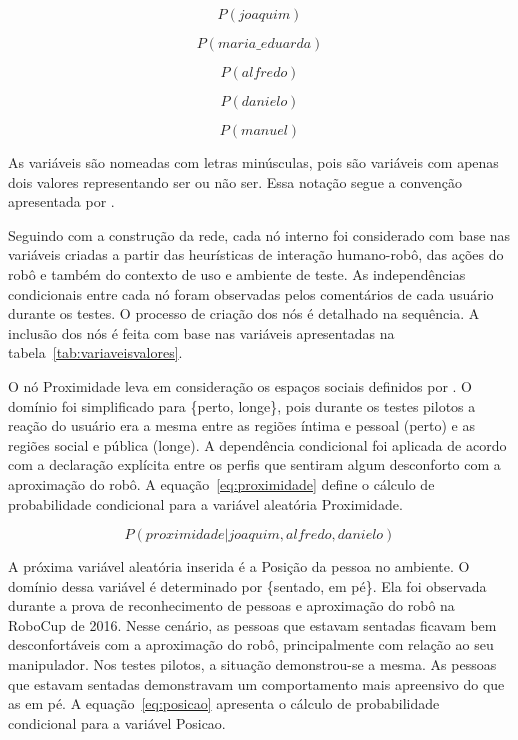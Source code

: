 \begin{equation}
	\label{eq:joaquim}
	P(joaquim)
\end{equation}

\begin{equation}
	\label{eq:mariaeduarda}
	P(maria\_eduarda)
\end{equation}

\begin{equation}
	\label{eq:alfredo}
	P(alfredo)
\end{equation}

\begin{equation}
	\label{eq:danielo}
	P(danielo)
\end{equation}

\begin{equation}
	\label{eq:manuel}
	P(manuel)
\end{equation}

As variáveis são nomeadas com letras minúsculas, pois são variáveis com apenas dois valores representando ser ou não ser. Essa notação segue a convenção apresentada por .

Seguindo com a construção da rede, cada nó interno foi considerado com base nas variáveis criadas a partir das heurísticas de interação humano-robô, das ações do robô e também do contexto de uso e ambiente de teste. As independências condicionais entre cada nó foram observadas pelos comentários de cada usuário durante os testes. O processo de criação dos nós é detalhado na sequência. A inclusão dos nós é feita com base nas variáveis apresentadas na tabela~\ref{tab:variaveisvalores}.

O nó Proximidade leva em consideração os espaços sociais definidos por . O domínio foi simplificado para \{perto, longe\}, pois durante os testes pilotos a reação do usuário era a mesma entre as regiões íntima e pessoal (perto) e as regiões social e pública (longe). A dependência condicional foi aplicada de acordo com a declaração explícita entre os perfis que sentiram algum desconforto com a aproximação do robô. A equação~\ref{eq:proximidade} define o cálculo de probabilidade condicional para a variável aleatória Proximidade.

\begin{equation}
	\label{eq:proximidade}
	P(proximidade | joaquim, alfredo, danielo)
\end{equation}

A próxima variável aleatória inserida é a Posição da pessoa no ambiente. O domínio dessa variável é determinado por \{sentado, em pé\}. Ela foi observada durante a prova de reconhecimento de pessoas e aproximação do robô na RoboCup de 2016. Nesse cenário, as pessoas que estavam sentadas ficavam bem desconfortáveis com a aproximação do robô, principalmente com relação ao seu manipulador. Nos testes pilotos, a situação demonstrou-se a mesma. As pessoas que estavam sentadas demonstravam um comportamento mais apreensivo do que as em pé. A equação~\ref{eq:posicao} apresenta o cálculo de probabilidade condicional para a variável Posicao.

